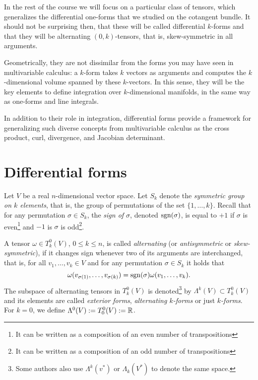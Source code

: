 In the rest of the course we will focus on a particular class of tensors, which generalizes the differential one-forms that we studied on the cotangent bundle.
It should not be surprising then, that these will be called differential $k$-forms and that they will be alternating $(0,k)$-tensors, that is, skew-symmetric in all arguments.

Geometrically, they are not dissimilar from the forms you may have seen in multivariable calculus: a $k$-form takes $k$ vectors as arguments and computes the $k$-dimensional volume spanned by these $k$-vectors.
In this sense, they will be the key elements to define integration over $k$-dimensional manifolds, in the same way as one-forms and line integrals.

In addition to their role in integration, differential forms provide a framework for generalizing such diverse concepts from multivariable calculus as the cross product, curl, divergence, and Jacobian determinant.

\section{Differential forms}

\begin{definition}
  Let $V$ be a real $n$-dimensional vector space.
  Let $S_k$ denote the \emph{symmetric group on $k$ elements}, that is, the group of permutations of the set $\{1,\ldots,k\}$.
  Recall that for any permutation $\sigma\in S_k$, the \emph{sign of $\sigma$}, denoted $\operatorname{sgn}(\sigma)$, is equal to $+1$ if $\sigma$ is even\footnote{It can be written as a composition of an even number of transpositions} and $-1$ is $\sigma$ is odd\footnote{It can be written as a composition of an odd number of transpositions}.

  A tensor $\omega\in T_k^0(V)$, $0\leq k\leq n$, is called \emph{alternating} (or \emph{antisymmetric} or \emph{skew-symmetric}), if it changes sign whenever two of its arguments are interchanged, that is,
  for all $v_1, \ldots, v_k\in V$ and for any permutation $\sigma\in S_k$ it holds that
  \begin{equation}
    \omega(v_{\sigma(1)}, \ldots, v_{\sigma(k)}) = \operatorname{sgn}(\sigma) \omega(v_1, \ldots, v_k).
  \end{equation}
  The subspace of alternating tensors in $T_k^0(V)$ is denoted\footnote{Some authors also use $\Lambda^k(v^*)$ or $\Lambda_k(V^*)$ to denote the same space.} by $\Lambda^k(V) \subset T_k^0(V)$ and its elements are called \emph{exterior forms}, \emph{alternating $k$-forms} or just  \emph{$k$-forms}.
  For $k=0$, we define $\Lambda^0(V) := T_0^0(V) := \mathbb{R}$.
\end{definition}

